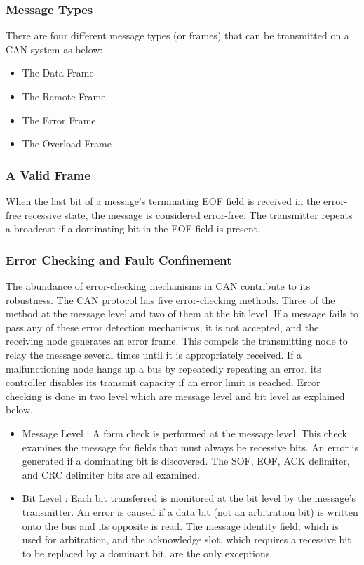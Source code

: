 \subsubsection{Message Types}
There are four different message types (or frames) that can be transmitted on a CAN system as below:

\begin{itemize}
\item The Data Frame
\item The Remote Frame
\item The Error Frame
\item The Overload Frame
\end{itemize}

\subsubsection{A Valid Frame}

When the last bit of a message's terminating EOF field is received in the error-free recessive state, the message is considered error-free. The transmitter repeats a broadcast if a dominating bit in the EOF field is present.

\subsubsection{Error Checking and Fault Confinement}

The abundance of error-checking mechanisms in CAN contribute to its robustness. The CAN protocol has five error-checking methods. Three of the method at the message level and two of them at the bit level. If a message fails to pass any of these error detection mechanisms, it is not accepted, and the receiving node generates an error frame. This compels the transmitting node to relay the message several times until it is appropriately received. If a malfunctioning node hangs up a bus by repeatedly repeating an error, its controller disables its transmit capacity if an error limit is reached. Error checking is done in two level which are message level and bit level as explained below.

\begin{itemize}
    \item Message Level : 
A form check is performed at the message level. This check examines the message for fields that must always be recessive bits. An error is generated if a dominating bit is discovered. The SOF, EOF, ACK delimiter, and CRC delimiter bits are all examined.
    \item Bit Level :
Each bit transferred is monitored at the bit level by the message's transmitter. An error is caused if a data bit (not an arbitration bit) is written onto the bus and its opposite is read. The message identity field, which is used for arbitration, and the acknowledge slot, which requires a recessive bit to be replaced by a dominant bit, are the only exceptions.
\end{itemize}


